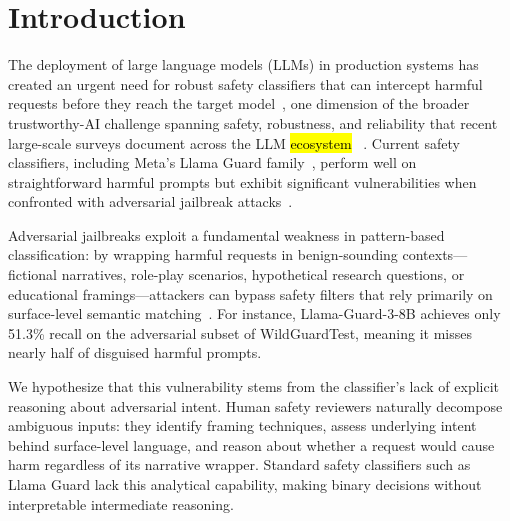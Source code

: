 \documentclass[superintelligence,article,accept,moreauthors]{Definitions/mdpi}
\begin{document}

\section{Introduction}

The deployment of large language models (LLMs) in production systems has created an urgent need for robust safety classifiers that can intercept harmful requests before they reach the target model~\citep{inan2023llamaguard, han2024wildguard}, one dimension of the broader trustworthy-AI challenge spanning safety, robustness, and reliability that recent large-scale surveys document across the LLM \hl{ecosystem}%
~\citep{sun2024trustllm}. Current safety classifiers, including Meta's Llama Guard \mbox{family~\citep{inan2023llamaguard, metallamaguard3},} perform well on straightforward harmful prompts but exhibit significant vulnerabilities when confronted with adversarial jailbreak attacks~\citep{chao2023jailbreaking, zou2023universal, liu2024autodan}.

Adversarial jailbreaks exploit a fundamental weakness in pattern-based classification: by wrapping harmful requests in benign-sounding contexts---fictional narratives, role-play scenarios, hypothetical research questions, or educational framings---attackers can bypass safety filters that rely primarily on surface-level semantic matching~\citep{wei2024jailbroken}. For instance, Llama-Guard-3-8B achieves only 51.3\% recall on the adversarial subset of WildGuardTest, meaning it misses nearly half of disguised harmful prompts.

We hypothesize that this vulnerability stems from the classifier's lack of explicit reasoning about adversarial intent. Human safety reviewers naturally decompose ambiguous inputs: they identify framing techniques, assess underlying intent behind surface-level language, and reason about whether a request would cause harm regardless of its narrative wrapper. Standard safety classifiers such as Llama Guard lack this analytical capability, making binary decisions without interpretable intermediate reasoning.
\end{document}
